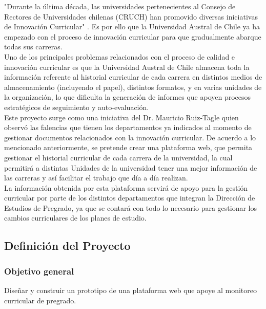 	"Durante la última década, las universidades pertenecientes al Consejo de Rectores de Universidades chilenas (CRUCH) 
	han promovido diversas iniciativas de Innovación Curricular" \cite{INN11}. Es por ello que la Universidad Austral de 
	Chile ya ha empezado con el proceso de innovación curricular para que gradualmente abarque todas sus carreras.
	\\
	
	Uno de los principales problemas relacionados con el proceso de calidad e innovación curricular es que la Universidad 
	Austral de Chile almacena toda la información referente al historial curricular de cada carrera en distintos medios 
	de almacenamiento (incluyendo el papel), distintos  formatos, y en varias unidades de la organización, lo que 
	dificulta la generación de informes que apoyen procesos estratégicos de seguimiento y auto-evaluación.
	\\
	
	Este proyecto surge como una iniciativa del Dr. Mauricio Ruiz-Tagle quien observó las falencias que tienen los 
	departamentos ya indicados al momento de gestionar documentos relacionados con la innovación curricular.  
	De acuerdo a lo mencionado anteriormente, se pretende crear una plataforma web, que permita gestionar el historial 
	curricular de cada carrera de la universidad, la cual permitirá a distintas Unidades de la universidad tener una 
	mejor información  de las carreras y así facilitar el trabajo que día a día realizan.
	\\
	
	La información obtenida por esta plataforma servirá de apoyo para la gestión curricular por parte de los distintos departamentos que integran la Dirección de Estudios de Pregrado, ya que se contará con todo lo necesario para gestionar los cambios curriculares de los planes de estudio.
	\\


	\subsection{Definición del Proyecto}
	
	\subsubsection{Objetivo general}
	
	Diseñar y construir  un prototipo de una plataforma web que apoye al monitoreo curricular de pregrado. \\
	\vspace{-0.4cm}
	
